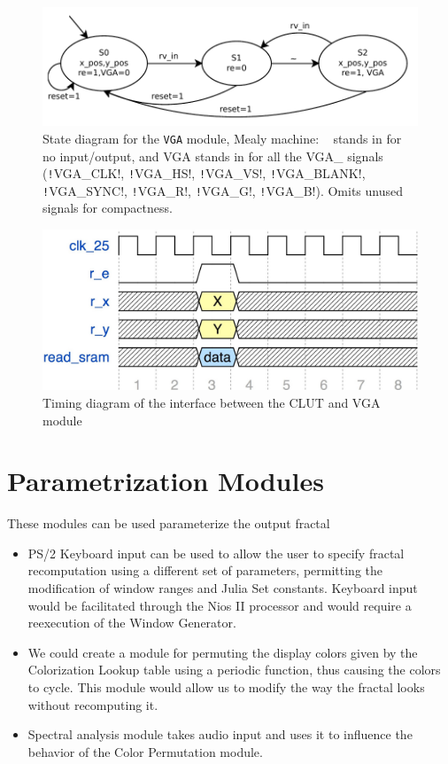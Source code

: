 \documentclass{article}
\begin{document}
\begin{figure}[h!]
  \centering
    \includegraphics[width=\textwidth]{state_diagrams/vga.pdf}
  \caption{State diagram for the \texttt{VGA} module, Mealy machine: ~
    stands in for no input/output, and VGA stands in for all the VGA\_
    signals (\texttt!VGA\_CLK!, \texttt!VGA\_HS!, \texttt!VGA\_VS!,
    \texttt!VGA\_BLANK!, \texttt!VGA\_SYNC!, \texttt!VGA\_R!, \texttt!VGA\_G!,
    \texttt!VGA\_B!). Omits unused signals for compactness.}
\end{figure}

\begin{figure}[h!]
  \centering
    \includegraphics[width=\textwidth]{timing_diagrams/clut_vga.pdf}
  \caption{Timing diagram of the interface between the CLUT and VGA module}
\end{figure}



\section{Parametrization Modules}

These modules can be used parameterize the output fractal

\begin{itemize}
\item PS/2 Keyboard input can be used to allow the user to specify
  fractal recomputation using a different set of parameters,
  permitting the modification of window ranges and Julia Set
  constants. Keyboard input would be facilitated through the Nios II
  processor and would require a reexecution of the Window Generator.
\item We could create a module for permuting the display colors given
  by the Colorization Lookup table using a periodic function, thus
  causing the colors to cycle. This module would allow us to modify
  the way the fractal looks without recomputing it.
\item Spectral analysis module takes audio input and uses it to
  influence the behavior of the Color Permutation module.
\end{itemize}
\end{document}
